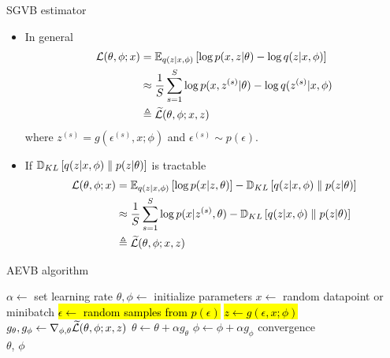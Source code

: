 \documentclass[unicode,11pt]{beamer}
\begin{document}
\begin{frame}{SGVB estimator}
  \begin{itemize}
  \item In general
    \begin{align*}
      \mathcal{L}(\theta, \phi; x)
      &= \E{q(z|x, \phi)}{\log p(x, z|\theta) - \log q(z|x, \phi)} \\
      &\approx \frac{1}{S} \sum\limits_{s = 1}^S
            \log p(x, z^{(s)}|\theta) - \log q(z^{(s)}|x, \phi) \\
      &\triangleq \widetilde{\mathcal{L}}(\theta, \phi; x, z)
    \end{align*}
    where $z^{(s)} = g(\epsilon^{(s)}, x; \phi)$ and $\epsilon^{(s)} \sim p(\epsilon)$.
  \item If $\mathbb{D}_{KL}\left[ q(z|x, \phi) \parallel p(z|\theta) \right]$ is tractable
    \begin{align*}
      \mathcal{L}(\theta, \phi; x)
      &= \E{q(z|x, \phi)}{\log p(x|z, \theta)} - \KL{q(z|x, \phi)}{p(z|\theta)} \\
      &\approx \frac{1}{S} \sum\limits_{s = 1}^S \log p(x|z^{(s)}, \theta)
       - \KL{q(z|x, \phi)}{p(z|\theta)} \\
      &\triangleq \widetilde{\mathcal{L}}(\theta, \phi; x, z)
    \end{align*}
  \end{itemize}
\end{frame}


\begin{frame}{AEVB algorithm \cite{kingma2013auto}}
  \centering
  \begin{algorithmic}
    \State $\alpha \gets$ set learning rate
    \State $\theta, \phi \gets$ initialize parameters
    \Repeat
       \State $x \gets$ random datapoint or minibatch
       \hl{\State $\epsilon \gets$ random samples from $p(\epsilon)$}
       \hl{\State $z \gets g(\epsilon, x; \phi)$}
       \State $g_\theta, g_\phi \gets \grad_{\phi, \theta} %
           \mathcal{\widetilde{L}}(\theta, \phi; x, z)$
       \State $\theta \gets \theta + \alpha g_\theta$
       \State $\phi \gets \phi + \alpha g_\phi$
    \Until convergence \\
    \Return $\theta$, $\phi$
  \end{algorithmic}
\end{frame}
\end{document}
